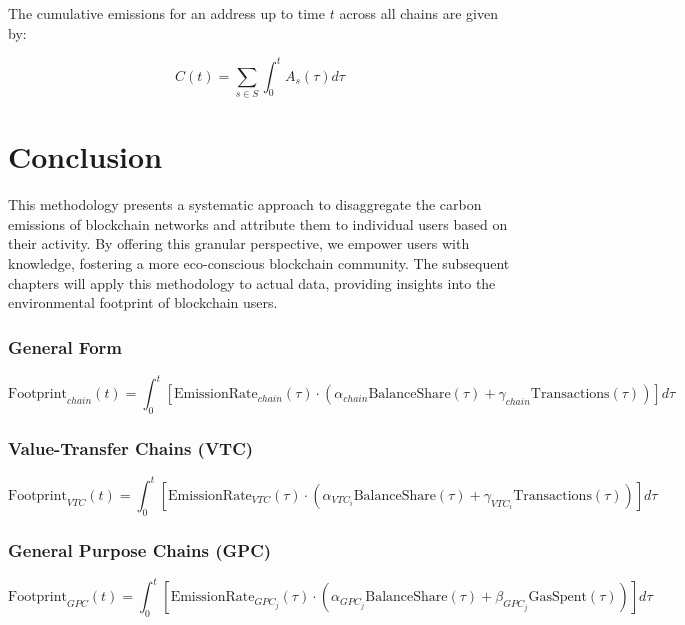 \documentclass[12pt,a4paper]{report}
\begin{document}
The cumulative emissions for an address up to time \( t \) across all chains are given by:

\[ C(t) = \sum_{s \in S} \int_{0}^{t} A_s(\tau) d\tau \]

\section{Conclusion}

This methodology presents a systematic approach to disaggregate the carbon emissions of blockchain networks and attribute them to individual users based on their activity. By offering this granular perspective, we empower users with knowledge, fostering a more eco-conscious blockchain community. The subsequent chapters will apply this methodology to actual data, providing insights into the environmental footprint of blockchain users.



\subsubsection*{General Form}
\begin{equation}
    \text{Footprint}_{chain}(t) = \int_{0}^{t} \left[ \text{EmissionRate}_{chain}(\tau) \cdot \left( \alpha_{chain} \text{BalanceShare}(\tau) + \gamma_{chain} \text{Transactions}(\tau) \right) \right] d\tau
\end{equation}




\subsubsection*{Value-Transfer Chains (VTC)}
\begin{equation}
    \text{Footprint}_{VTC}(t) = \int_{0}^{t} \left[ \text{EmissionRate}_{VTC}(\tau) \cdot \left( \alpha_{VTC_i} \text{BalanceShare}(\tau) + \gamma_{VTC_i} \text{Transactions}(\tau) \right) \right] d\tau
\end{equation}

\subsubsection*{General Purpose Chains (GPC)}
\begin{equation}
    \text{Footprint}_{GPC}(t) = \int_{0}^{t} \left[ \text{EmissionRate}_{GPC_j}(\tau) \cdot \left( \alpha_{GPC_j} \text{BalanceShare}(\tau) + \beta_{GPC_j} \text{GasSpent}(\tau) \right) \right] d\tau
\end{equation}
\end{document}
